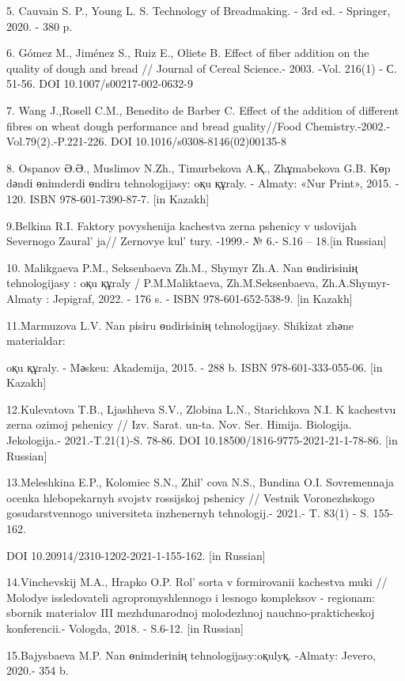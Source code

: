 {{5. Cauvain S. P., Young L. S. Technology of Breadmaking. - 3rd ed. -
Springer, 2020. - 380 p.

6. Gómez M., Jiménez S., Ruiz E., Oliete B. Effect of fiber addition on
the quality of dough and bread // Journal of Cereal Science.- 2003.
-Vol. 216(1) - С. 51-56. DOI 10.1007/s00217-002-0632-9

7. Wang J.,Rosell C.M., Benedito de Barber C. Effect of the addition of
different fibres on wheat dough performance and bread guality//Food
Chemistry.-2002.-Vol.79(2).-P.221-226. DOI 10.1016/s0308-8146(02)00135-8

8. Ospanov Ә.Ә., Muslimov N.Zh., Timurbekova A.Қ., Zhұmabekova G.B. Kөp
dәndі өnіmderdі өndіru tehnologijasy: oқu құraly. - Almaty: «Nur Print»,
2015. - 120. ISBN 978-601-7390-87-7. {[}in Kazakh{]}

9.Belkina R.I. Faktory povyshenija kachestva zerna pshenicy v uslovijah
Severnogo Zaural' ja// Zernovye kul' tury.
-1999.- № 6.- S.16 -- 18.{[}in Russian{]}

10. Malikgaeva P.M., Seksenbaeva Zh.M., Shymyr Zh.A. Nan өndіrіsіnің
tehnologijasy : oқu құraly / P.M.Maliktaeva, Zh.M.Seksenbaeva,
Zh.A.Shymyr- Almaty : Jepigraf, 2022. - 176 s. - ISBN 978-601-652-538-9.
{[}in Kazakh{]}

11.Marmuzova L.V. Nan pіsіru өndіrіsіnің tehnologijasy. Shikіzat zhәne
materialdar:

oқu құraly. - Mәskeu: Akademija, 2015. - 288 b. ISBN 978-601-333-055-06.
{[}in Kazakh{]}

12.Kulevatova T.B., Ljashheva S.V., Zlobina L.N., Starichkova N.I. K
kachestvu zerna ozimoj pshenicy // Izv. Sarat. un-ta. Nov. Ser. Himija.
Biologija. Jekologija.- 2021.-T.21(1)-S. 78-86. DOI
10.18500/1816-9775-2021-21-1-78-86. {[}in Russian{]}

13.Meleshkina E.P., Kolomiec S.N., Zhil' cova N.S.,
Bundina O.I. Sovremennaja ocenka hlebopekarnyh svojstv rossijskoj
pshenicy // Vestnik Voronezhskogo gosudarstvennogo universiteta
inzhenernyh tehnologij.- 2021.- T. 83(1) - S. 155-162.

DOI 10.20914/2310-1202-2021-1-155-162. {[}in Russian{]}

14.Vinchevskij M.A., Hrapko O.P. Rol'{} sorta v
formirovanii kachestva muki // Molodye issledovateli agropromyshlennogo
i lesnogo kompleksov - regionam: sbornik materialov III mezhdunarodnoj
molodezhnoj nauchno-prakticheskoj konferencii.- Vologda, 2018. - S.6-12.
{[}in Russian{]}

15.Bajysbaeva M.P. Nan өnіmderіnің tehnologijasy:oқulyқ. -Almaty:
Jevero, 2020.- 354 b.

}}
